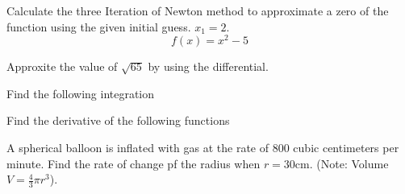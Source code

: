 \documentclass[11pt]{exam}
\begin{document}
\begin{questions}
\newpage
\addpoints
\question[4] Calculate the three Iteration of Newton method to approximate a zero of the function using the given initial guess. $x_1=2$. \[f(x)=x^2-5\]


\vspace{9cm}
\addpoints
\question[4] Approxite the value of $\sqrt{65}$ by using the differential. 

\newpage
\addpoints
\question[12] Find the following integration

\newpage
\question[6] Find the derivative of the following functions


\newpage
\addpoints
\question[4] A spherical balloon is inflated with gas at the rate of 800 cubic centimeters per minute. Find the rate of change pf the radius when $r=30$cm. (Note: Volume $V=\frac{4}{3}\pi r^3$).



\end{questions}
\end{document}
